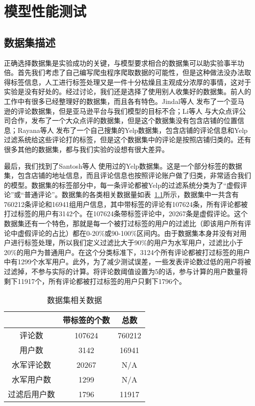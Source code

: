 
\chapter{模型性能测试}
\label{chap:exper}



\section{数据集描述}

正确选择数据集是实验成功的关键，与模型要求相合的数据集可以助实验事半功倍。首先我们考虑了自己编写爬虫程序爬取数据的可能性，但是这种做法没办法取得标签信息，人工进行标签处理又是一件十分枯燥且主观成分浓厚的事情，这对于实验是没有好处的。经过讨论，我们还是选择了使用别人收集好的数据集。前人的工作中有很多已经整理好的数据集，而且各有特色。Jindal等人 \parencite{Jindal:2008}发布了一个亚马逊的评论数据集，但是亚马逊平台与我们模型的目标不合；Li等人 \parencite{Li:2014}与大众点评公司合作，发布了一个大众点评的数据集，但是这个数据集没有包含店铺的位置信息；Rayana等人 \parencite{Rayana:2015}发布了一个自己搜集的Yelp数据集，包含店铺的评论信息和Yelp过滤系统给这些评论打的标签，但是这个数据集中的评论是按照店铺归类的。还有很多其他的数据集，都与我们实验的设想有很大差异。

最后，我们找到了Santosh等人 \parencite{Santosh:2016}使用过的Yelp数据集。这是一个部分标签的数据集，包含店铺的地址信息，而且评论信息也按照评论账户做了归类，非常适合我们的模型。数据集的标签部分中，每一条评论都被Yelp的过滤系统分类为了“虚假评论”或“普通评论”。数据集的各类相关数据量如表~\ref{tbl:dataset}所示，数据集中一共含有760212条评论和16941组用户信息，其中带标签的评论有107624条，所有评论都被打过标签的用户有3142个。在107624条带标签评论中，20267条是虚假评论。这个数据集还有一个特色，那就是每一个被打过标签的用户的过滤比（即该用户所有评论中虚假评论的占比）都在0-20\%或90-100\%区间内。由于数据集本身并没有对用户进行标签处理，所以我们定义过滤比大于90\%的用户为水军用户，过滤比小于20\%的用户为普通用户。在这个分类标准下，3124个所有评论都被打过标签的用户中有1299个水军用户。此外，为了减少测试误差，一些发表评论数过低的用户将被过滤掉，不参与实际的计算。将评论数阈值设置为5的话，参与计算的用户数量将剩下11917个，所有评论都被打过标签的用户只剩下1796个。

\begin{table}[htbp]
	\caption[数据集相关数据]{数据集相关数据}
	\label{tbl:dataset}
	\centering
	\begin{tabular}{ccc}
		\toprule
		& 带标签的个数 & 总数  \\
		\midrule
		评论数  & 107624  & 760212  \\
		用户数  & 3142  &	16941 \\
		水军评论数 & 20267 & N/A \\
		水军用户数 & 1299 & N/A \\
		过滤后用户数 & 1796 & 11917 \\
		\bottomrule
	\end{tabular}
\end{table}

